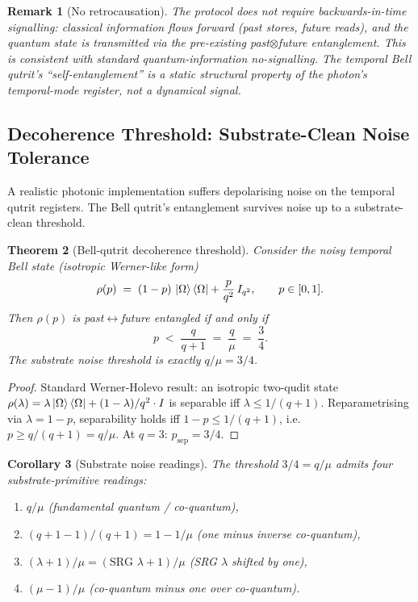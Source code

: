 ﻿\documentclass[12pt]{article}
\newtheorem{theorem}{Theorem}[section]
\newtheorem{corollary}[theorem]{Corollary}
\newtheorem{remark}[theorem]{Remark}
\begin{document}
\begin{remark}[No retrocausation]
The protocol does \emph{not} require backwards-in-time signalling: classical
information flows forward (past stores, future reads), and the quantum state
is transmitted via the pre-existing past$\otimes$future entanglement.  This
is consistent with standard quantum-information no-signalling.  The temporal
Bell qutrit's ``self-entanglement'' is a static structural property of the
photon's temporal-mode register, not a dynamical signal.
\end{remark}

\subsection{Decoherence Threshold: Substrate-Clean Noise Tolerance}
\label{sec:decoherence}

A realistic photonic implementation suffers depolarising noise on the
temporal qutrit registers.  The Bell qutrit's entanglement survives noise
up to a substrate-clean threshold.

\begin{theorem}[Bell-qutrit decoherence threshold]\label{thm:noise_threshold}
Consider the noisy temporal Bell state (isotropic Werner-like form)
\begin{equation}
  \rho(p) \;=\; (1-p)\,\ket{\Omega}\bra{\Omega} + \frac{p}{q^2}\, I_{q^2},
  \qquad p \in [0, 1].
  \label{eq:werner}
\end{equation}
Then $\rho(p)$ is past$\leftrightarrow$future entangled \emph{if and only if}
\begin{equation}
  p \;<\; \frac{q}{q+1} \;=\; \frac{q}{\mu} \;=\; \frac{3}{4}.
  \label{eq:noise_thresh}
\end{equation}
The substrate noise threshold is exactly $q/\mu = 3/4$.
\end{theorem}

\begin{proof}
Standard Werner-Holevo result: an isotropic two-qudit state
$\rho(\lambda) = \lambda\ket{\Omega}\bra{\Omega} + (1-\lambda)/q^2 \cdot I$
is separable iff $\lambda \le 1/(q+1)$.  Reparametrising via $\lambda = 1-p$,
separability holds iff $1-p \le 1/(q+1)$, i.e.\ $p \ge q/(q+1) = q/\mu$.
At $q = 3$: $p_{\text{sep}} = 3/4$.
\end{proof}

\begin{corollary}[Substrate noise readings]\label{cor:noise_readings}
The threshold $3/4 = q/\mu$ admits four substrate-primitive readings:
\begin{enumerate}[label=(\roman*),noitemsep]
  \item $q/\mu$ (fundamental quantum / co-quantum),
  \item $(q+1-1)/(q+1) = 1 - 1/\mu$ (one minus inverse co-quantum),
  \item $(\lambda+1)/\mu = (\text{SRG }\lambda + 1)/\mu$ (SRG $\lambda$ shifted by one),
  \item $(\mu-1)/\mu$ (co-quantum minus one over co-quantum).
\end{enumerate}
\end{corollary}
\end{document}

